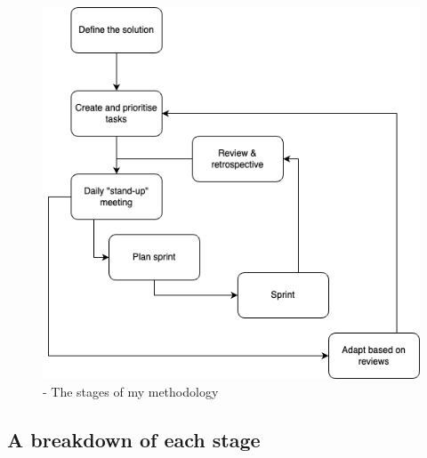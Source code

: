 \begin{figure}[h!] 
	\centering    
	\includegraphics[width=1\textwidth]{Methodology diagram (1).png}
	\caption{- The stages of my methodology}
\end{figure}

\subsection{A breakdown of each stage}

